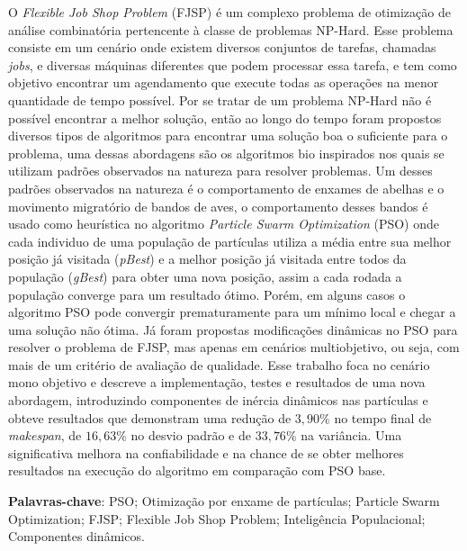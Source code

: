 \par

\begin{resumo}
    O \textit{Flexible Job Shop Problem} (FJSP) é um complexo problema de otimização de análise combinatória pertencente à classe de problemas NP-Hard. Esse problema consiste em um cenário onde existem diversos conjuntos de tarefas, chamadas \textit{jobs}, e diversas máquinas diferentes que podem processar essa tarefa, e tem como objetivo encontrar um agendamento que execute todas as operações na menor quantidade de tempo possível. Por se tratar de um problema NP-Hard não é possível encontrar a melhor solução, então ao longo do tempo foram propostos diversos tipos de algoritmos para encontrar uma solução boa o suficiente para o problema, uma dessas abordagens são os algoritmos bio inspirados nos quais se utilizam padrões observados na natureza para resolver problemas. Um desses padrões observados na natureza é o comportamento de enxames de abelhas e o movimento migratório de bandos de aves, o comportamento desses bandos é usado como heurística no algoritmo \textit{Particle Swarm Optimization} (PSO) onde cada individuo de uma população de partículas utiliza a média entre sua melhor posição já visitada (\textit{pBest}) e a melhor posição já visitada entre todos da população (\textit{gBest}) para obter uma nova posição, assim a cada rodada a população converge para um resultado ótimo. Porém, em alguns casos o algoritmo PSO pode convergir prematuramente para um mínimo local e chegar a uma solução não ótima. Já foram propostas modificações dinâmicas no PSO para resolver o problema de FJSP, mas apenas em cenários multiobjetivo, ou seja, com mais de um critério de avaliação de qualidade. Esse trabalho foca no cenário mono objetivo e descreve a implementação, testes e resultados de uma nova abordagem, introduzindo componentes de inércia dinâmicos nas partículas e obteve resultados que demonstram uma redução de $3,90\%$ no tempo final de \textit{makespan}, de $16,63\%$ no desvio padrão e de $33,76\%$ na variância. Uma significativa melhora na confiabilidade e na chance de se obter melhores resultados na execução do algoritmo em comparação com PSO base.\vspace{\onelineskip}

\noindent\textbf{Palavras-chave}: PSO; Otimização por enxame de partículas; Particle Swarm Optimization; FJSP; Flexible Job Shop Problem; Inteligência Populacional; Componentes dinâmicos.
\end{resumo}
